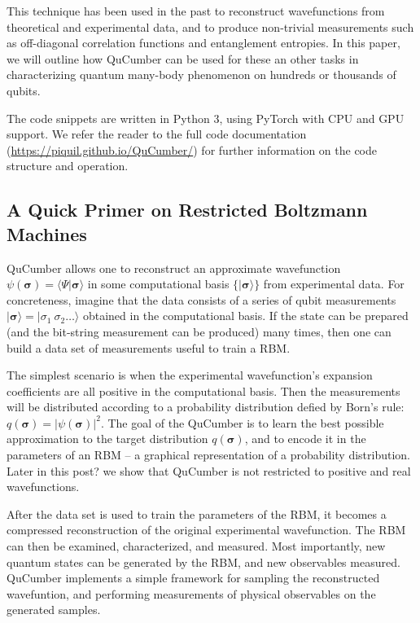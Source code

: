 \documentclass[submission, Phys]{SciPost}
\begin{document}
This technique has been used in the past to reconstruct wavefunctions from theoretical and experimental data, and to produce non-trivial measurements such as off-diagonal correlation functions and entanglement entropies.
In this paper, we will outline how QuCumber can be used for these an other tasks in characterizing quantum many-body phenomenon on hundreds or thousands of qubits.

The code snippets are written in Python 3, using PyTorch with CPU and GPU support.  We refer the reader to the full code documentation (\url{https://piquil.github.io/QuCumber/}) for further information on the code structure and operation.


\subsection{A Quick Primer on Restricted Boltzmann Machines}

QuCumber allows one to reconstruct an approximate wavefunction $\psi( \boldsymbol{\sigma} )  = \langle \Psi \vert \boldsymbol{\sigma} \rangle$ in some computational basis $\{ \vert \boldsymbol{ \sigma} \rangle \}$ from experimental data.   For concreteness, imagine that the data consists of a series of qubit measurements $\vert {\boldsymbol{ \sigma}} \rangle = \vert { \sigma}_1~{ \sigma}_2 \dots \rangle$ obtained in the computational basis. If the state can be prepared (and the bit-string measurement can be produced) many times, then one can build a data set of measurements useful to train a RBM.

The simplest scenario is when the experimental wavefunction's expansion coefficients are all positive in the computational basis.  
Then the measurements will be distributed according to a probability distribution defied by Born's rule: $q(\boldsymbol{\sigma}) = | \psi( \boldsymbol{\sigma} ) |^2$.
The goal of the QuCumber is to learn the best possible approximation to the target distribution $q(\boldsymbol{\sigma})$, and to encode it in the parameters of an RBM -- a graphical representation of a probability distribution. Later in this post? we show that QuCumber is not restricted to positive and real wavefunctions.

After the data set is used to train the parameters of the RBM, it becomes a compressed reconstruction of the original experimental wavefunction.  The RBM can then be examined, characterized, and measured.  Most importantly, new quantum states can be generated by the RBM, and new observables measured.  QuCumber implements a simple framework for sampling the reconstructed wavefuntion, and performing measurements of physical observables on the generated samples.
\end{document}
